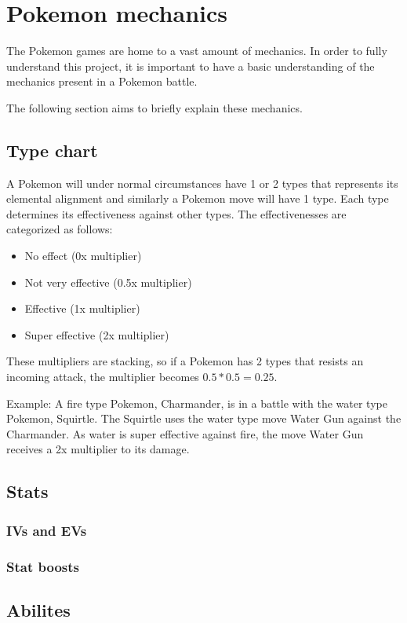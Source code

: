 \section{Pokemon mechanics}
\label{sec:pokemon-mechanics}

The Pokemon games are home to a vast amount of mechanics. In order to fully understand
this project, it is important to have a basic understanding of the mechanics present in a Pokemon battle.

The following section aims to briefly explain these mechanics.

\subsection{Type chart}
A Pokemon will under normal circumstances have 1 or 2 types that represents its elemental alignment and similarly a Pokemon move will have 1 type.
Each type determines its effectiveness against other types. The effectivenesses are categorized as follows:
\begin{itemize}
  \item No effect (0x multiplier)
  \item Not very effective (0.5x multiplier)
  \item Effective (1x multiplier)
  \item Super effective (2x multiplier)
\end{itemize}
These multipliers are stacking, so if a Pokemon has 2 types that resists an incoming attack, the multiplier becomes $ 0.5*0.5=0.25 $.

Example: A fire type Pokemon, Charmander, is in a battle with the water type Pokemon, Squirtle.
The Squirtle uses the water type move Water Gun against the Charmander. As water is super effective against fire, the move 
Water Gun receives a 2x multiplier to its damage.

\subsection{Stats}
\subsubsection{IVs and EVs}
\subsubsection{Stat boosts}
\subsection{Abilites}
